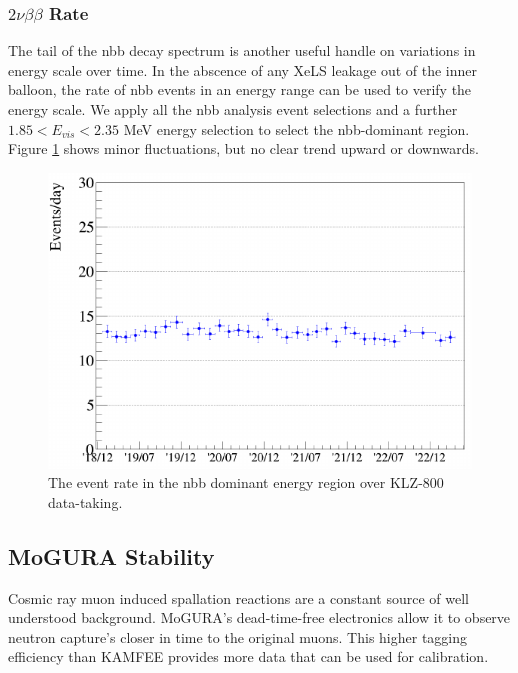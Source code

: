 \subsubsection*{$2\nu\beta\beta$ Rate}
The tail of the \2nbb decay spectrum is another useful handle on variations in energy scale over time. In the abscence of any XeLS leakage out of the inner balloon, the rate of \2nbb events in an energy range can be used to verify the energy scale. We apply all the \0nbb analysis event selections and a further $1.85<E_{vis}<2.35$ MeV energy selection to select the \2nbb-dominant region. Figure \ref{fig:2nu_stability} shows minor fluctuations, but no clear trend upward or downwards.
\begin{figure}[htb]
	\centering
	\includegraphics[scale=0.65]{2nu_trend.png}
	\caption{The event rate in the \2nbb dominant energy region over KLZ-800 data-taking.}
	\label{fig:2nu_stability}
\end{figure}
\subsection{MoGURA Stability}
Cosmic ray muon induced spallation reactions are a constant source of well understood background. MoGURA's dead-time-free electronics allow it to observe neutron capture's closer in time to the original muons. This higher tagging efficiency than KAMFEE provides more data that can be used for calibration.

